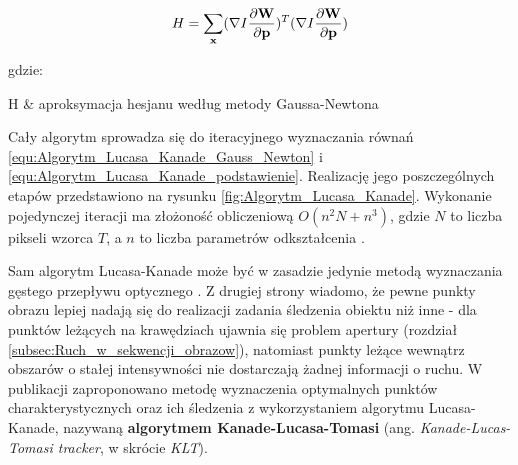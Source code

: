 \begin{equation}
\label{equ:Algorytm_Lucasa_Kanade_hesjan}
	H = \sum\limits_{\mathbf{x}}(\nabla I \frac{\partial \mathbf{W}}{\partial \mathbf{p}})^T (\nabla I \frac{\partial \mathbf{W}}{\partial \mathbf{p}})
\end{equation}

\noindent
gdzie:
\begin{conditions}
	H & aproksymacja hesjanu według metody Gaussa-Newtona \\
\end{conditions}

Cały algorytm sprowadza się do iteracyjnego wyznaczania równań \ref{equ:Algorytm_Lucasa_Kanade_Gauss_Newton} i \ref{equ:Algorytm_Lucasa_Kanade_podstawienie}. Realizację jego poszczególnych etapów przedstawiono na rysunku \ref{fig:Algorytm_Lucasa_Kanade}. Wykonanie pojedynczej iteracji ma złożoność obliczeniową $O(n^2 N + n^3)$, gdzie $N$ to liczba pikseli wzorca $T$, a $n$ to liczba parametrów odkształcenia \cite{Baker2004}.

Sam algorytm Lucasa-Kanade może być w zasadzie jedynie metodą wyznaczania gęstego przepływu optycznego \cite{Yilmaz2006}. Z drugiej strony wiadomo, że pewne punkty obrazu lepiej nadają się do realizacji zadania śledzenia obiektu niż inne \cite{Tomasi1991} - dla punktów leżących na krawędziach ujawnia się problem apertury (rozdział \ref{subsec:Ruch_w_sekwencji_obrazow}), natomiast 
punkty leżące wewnątrz obszarów o stałej intensywności nie dostarczają żadnej informacji o ruchu. W publikacji \cite{Tomasi1991} zaproponowano metodę wyznaczenia optymalnych punktów charakterystycznych oraz ich śledzenia z wykorzystaniem algorytmu Lucasa-Kanade, nazywaną \textbf{algorytmem Kanade-Lucasa-Tomasi} (ang. \textit{Kanade-Lucas-Tomasi tracker}, w skrócie \textit{KLT}).

